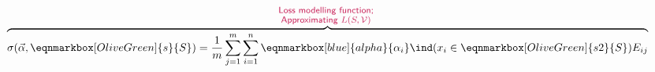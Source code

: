 \documentclass[letterpaper,twocolumn,10pt]{article}
\begin{document}
\begin{equation}
 \overbrace {\sigma({\Vec{\alpha}}, \eqnmarkbox[OliveGreen]{s}{S}) = \frac{1}{m} \sum_{j=1}^m \sum_{i=1}^n \eqnmarkbox[blue]{alpha}{\alpha_i} \ind(x_i\in \eqnmarkbox[OliveGreen]{s2}{S}) E_{ij}}^{\substack{\text{\sf \footnotesize \textcolor{purple!85}{Loss modelling function;
	}} \\ \text{\sf \footnotesize \textcolor{purple!85}{Approximating $L(S,\mathcal{V})$
}} } }
\end{equation}

\end{document}
